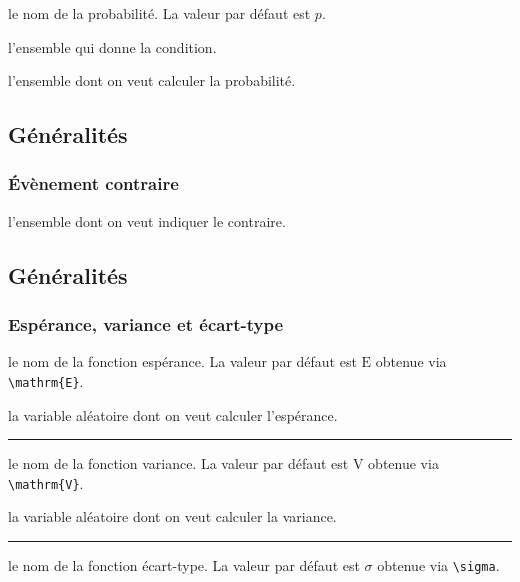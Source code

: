 \documentclass[12pt,a4paper]{book}
\theoremstyle{definition}
\newcommand\separation{
	\medskip
	\hfill\rule{0.5\textwidth}{0.75pt}\hfill
	\medskip
}
\newcommand\extraspace{
	\vspace{0.25em}
}
\begin{document}
{{\extraspace




\IDoption{} le nom de la probabilité. La valeur par défaut est $p$.

 l'ensemble qui donne la condition.

 l'ensemble dont on veut calculer la probabilité.


\subsection{Généralités}

\subsubsection{Évènement contraire}




\IDarg{} l'ensemble dont on veut indiquer le contraire.


\subsection{Généralités}

\subsubsection{Espérance, variance et écart-type}




\IDoption{} le nom de la fonction espérance. La valeur par défaut est $\mathrm{E}$ obtenue via \verb#\mathrm{E}#.

\IDarg{} la variable aléatoire dont on veut calculer l'espérance.


\separation



\IDoption{} le nom de la fonction variance. La valeur par défaut est $\mathrm{V}$ obtenue via \verb#\mathrm{V}#.

\IDarg{} la variable aléatoire dont on veut calculer la variance.


\separation



\IDoption{} le nom de la fonction écart-type. La valeur par défaut est $\sigma$ obtenue via \verb#\sigma#.

}}
\end{document}

